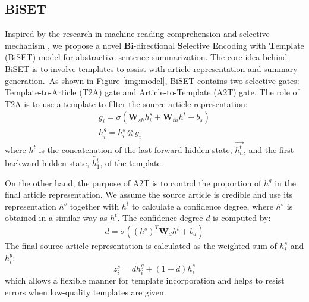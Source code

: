 \documentclass[11pt,a4paper]{article}
\begin{document}
\begin{spacing}{1.0}
\subsection{BiSET}
Inspired by the research in machine reading comprehension \cite{seo2016bidirectional} and selective mechanism \cite{Zhou2017Selective}, we propose a novel \textbf{Bi}-directional \textbf{S}elective \textbf{E}ncoding with \textbf{T}emplate (BiSET) model for abstractive sentence summarization. The core idea behind BiSET is to involve templates to assist with article representation and summary generation.~As shown in Figure \ref{img:model}, BiSET contains two selective gates: Template-to-Article (T2A) gate and Article-to-Template (A2T) gate. The role of T2A is to use a template to filter the source article representation:
\begin{gather}
    g_i=\sigma(\textbf{W}_{sh} h_i^s+\textbf{W}_{th} h^t+b_s)\\
    h_i^g=h_i^s\otimes g_i
\end{gather}
where $h^t$ is the concatenation of the last forward hidden state, $\overrightarrow{h_n^t}$, and the first backward hidden state, $\overleftarrow{h_1^t}$, of the template.

On the other hand, the purpose of A2T is to control the proportion of $h^g$ in the final article representation. We assume the source article is credible and use its representation $h^s$ together with $h^t$ to calculate a confidence degree, where $h^s$ is obtained in a similar way as $h^t$. The confidence degree $d$ is computed by:
\begin{equation}
    d=\sigma((h^s)^T\textbf{W}_d h^t+b_d)
\end{equation}
The final source article representation is calculated as the weighted sum of $h_i^s$ and $h_i^g$:
\begin{equation}
    z_i^s=dh_i^g+(1-d)h_i^s
\end{equation}
which allows a flexible manner for template incorporation and helps to resist errors when low-quality templates are given.


\end{spacing}
\end{document}
